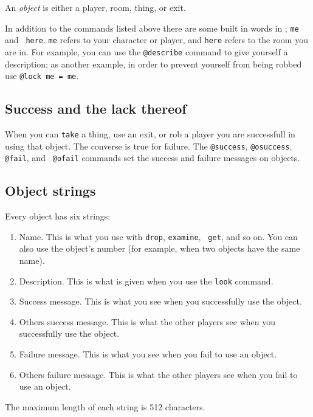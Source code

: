 An {\em object} is either a player, room, thing, or exit.

In addition to the commands listed above there are some built in words
in {\tinymud}; {\tt me} and {\tt
here}.  {\tt me} refers to your character or
player, and {\tt here} refers to the room you are in.  For example,
you can use the \verb|@describe| command to give yourself a
description; as another example, in order to prevent yourself from
being robbed use {\tt @lock me = me\/}.

\subsection{Success and the lack thereof}
\label{sec:success-and-the-lack-thereof}

When you can {\tt take} a thing, use an exit, or rob a player you are
successfull in using that object.  The converse is true for failure.
The {\tt @success\/}, {\tt @osuccess\/}, {\tt @fail\/}, and {\tt
@ofail} commands set the success and failure messages on objects.%
%
%
%

\subsection{Object strings}
\label{sec:object-strings}

Every object has six strings:
\begin{enumerate}
\item
Name.  This is what you use with {\tt drop\/}, {\tt examine\/}, {\tt
get\/}, and so on.  You can also use the object's number (for example,
when two objects have the same name).

\item
Description.  This is what is given when you use the {\tt look}
command.

\item
Success message.  This is what you see when you successfully use the
object.

\item
Others success message.  This is what the other players see when you
successfully use the object.

\item
Failure message.  This is what you see when you fail to use an object.

\item
Others failure message.  This is what the other players see when you
fail to use an object.
\end{enumerate}
The maximum length of each string is 512 characters.

